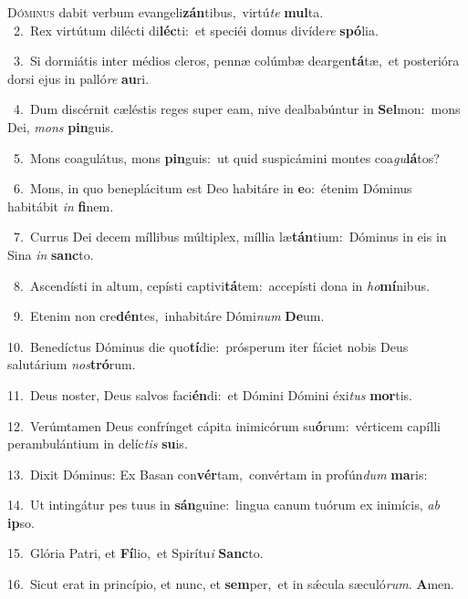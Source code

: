 \lettrine{\initial\textcolor{\initialcolor}{D}}{óminus} dabit verbum evangeli\-\textbf{zán}\-tibus,~\star virtú\textit{te} \textbf{mul}\-ta.\\
{\numbfont\textcolor{\numbcolor}{~2.}}~Rex virtútum dilécti di\-\textbf{léc}\-ti:~\star et speciéi domus divíde\textit{re} \textbf{spó}\-lia.\par
{\numbfont\textcolor{\numbcolor}{~3.}}~Si dormiátis inter médios cleros, pennæ colúmbæ deargen\-\textbf{tá}\-tæ,~\star et posterióra dorsi ejus in palló\textit{re} \textbf{au}\-ri.\par
{\numbfont\textcolor{\numbcolor}{~4.}}~Dum discérnit cæléstis reges super eam, nive dealbabúntur in \textbf{Sel}\-mon:~\star mons Dei, \textit{mons} \textbf{pin}\-guis.\par
{\numbfont\textcolor{\numbcolor}{~5.}}~Mons coagulátus, mons \textbf{pin}\-guis:~\star ut quid suspicámini montes coa\-\textit{gu}\-\textbf{lá}tos?\par
{\numbfont\textcolor{\numbcolor}{~6.}}~Mons, in quo beneplácitum est Deo habitáre in \textbf{e}\-o:~\star étenim Dóminus habitábit \textit{in} \textbf{fi}\-nem.\par
{\numbfont\textcolor{\numbcolor}{~7.}}~Currus Dei decem míllibus múltiplex, míllia læ\-\textbf{tán}\-tium:~\star Dóminus in eis in Sina \textit{in} \textbf{sanc}\-to.\par
{\numbfont\textcolor{\numbcolor}{~8.}}~Ascendísti in altum, cepísti captivi\-\textbf{tá}\-tem:~\star accepísti dona in \textit{ho}\-\textbf{mí}nibus.\par
{\numbfont\textcolor{\numbcolor}{~9.}}~Etenim non cre\-\textbf{dén}\-tes,~\star inhabitáre Dómi\textit{num} \textbf{De}\-um.\par
{\numbfont\textcolor{\numbcolor}{10.}}~Benedíctus Dóminus die quo\-\textbf{tí}\-die:~\star prósperum iter fáciet nobis Deus salutárium \textit{nos}\-\textbf{tró}rum.\par
{\numbfont\textcolor{\numbcolor}{11.}}~Deus noster, Deus salvos faci\-\textbf{én}\-di:~\star et Dómini Dómini éxi\textit{tus} \textbf{mor}\-tis.\par
{\numbfont\textcolor{\numbcolor}{12.}}~Verúmtamen Deus confrínget cápita inimicórum su\-\textbf{ó}\-rum:~\star vérticem capílli perambulántium in delíc\textit{tis} \textbf{su}\-is.\par
{\numbfont\textcolor{\numbcolor}{13.}}~Dixit Dóminus: Ex Basan con\-\textbf{vér}\-tam,~\star convértam in profún\textit{dum} \textbf{ma}\-ris:\par
{\numbfont\textcolor{\numbcolor}{14.}}~Ut intingátur pes tuus in \textbf{sán}\-guine:~\star lingua canum tuórum ex inimícis, \textit{ab} \textbf{ip}\-so.\par
{\numbfont\textcolor{\numbcolor}{15.}}~Glória Patri, et \textbf{Fí}\-lio,~\star et Spirítu\textit{i} \textbf{Sanc}\-to.\par
{\numbfont\textcolor{\numbcolor}{16.}}~Sicut erat in princípio, et nunc, et \textbf{sem}\-per,~\star et in sǽcula sæculó\-\textit{rum}\-. \textbf{A}\-men.\par
